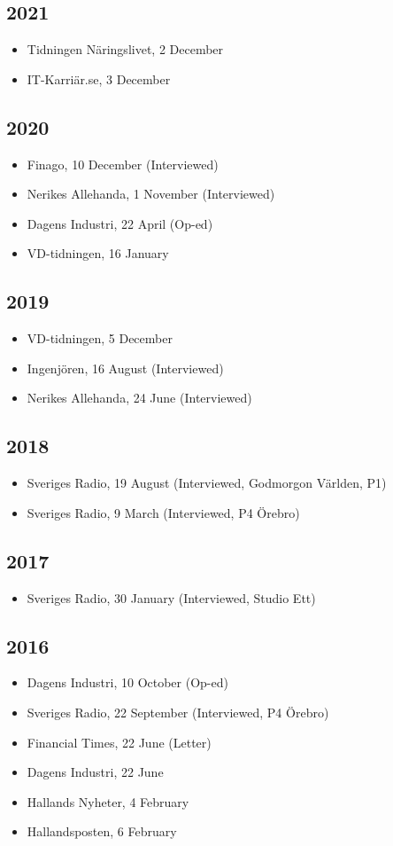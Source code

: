 \documentclass[11pt,a4paper]{article}
\newcommand{\cventry}[1]{\item #1}
\begin{document}
\subsection{2021}
\begin{itemize}
  \cventry{Tidningen Näringslivet, 2 December}
  \cventry{IT-Karriär.se, 3 December}
\end{itemize}

\subsection{2020}
\begin{itemize}
  \cventry{Finago, 10 December (Interviewed)}
  \cventry{Nerikes Allehanda, 1 November (Interviewed)}
  \cventry{Dagens Industri, 22 April (Op-ed)}
  \cventry{VD-tidningen, 16 January}
\end{itemize}

\subsection{2019}
\begin{itemize}
  \cventry{VD-tidningen, 5 December}
  \cventry{Ingenjören, 16 August (Interviewed)}
  \cventry{Nerikes Allehanda, 24 June (Interviewed)}
\end{itemize}

\subsection{2018}
\begin{itemize}
  \cventry{Sveriges Radio, 19 August (Interviewed, Godmorgon Världen, P1)}
  \cventry{Sveriges Radio, 9 March (Interviewed, P4 Örebro)}
\end{itemize}

\subsection{2017}
\begin{itemize}
  \cventry{Sveriges Radio, 30 January (Interviewed, Studio Ett)}
\end{itemize}

\subsection{2016}
\begin{itemize}
  \cventry{Dagens Industri, 10 October (Op-ed)}
  \cventry{Sveriges Radio, 22 September (Interviewed, P4 Örebro)}
  \cventry{Financial Times, 22 June (Letter)}
  \cventry{Dagens Industri, 22 June}
  \cventry{Hallands Nyheter, 4 February}
  \cventry{Hallandsposten, 6 February}
\end{itemize}
\end{document}

